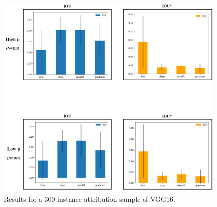 \documentclass[main]{subfiles}
\begin{document}
\begin{figure}[h]\centering
\vfill
\includegraphics[scale=0.30]{appendix_C.png}
\caption{Results for a 300-instance attribution sample of VGG16. }
\label{vggExtraFig}
\vfill
\end{figure}
\end{document}
